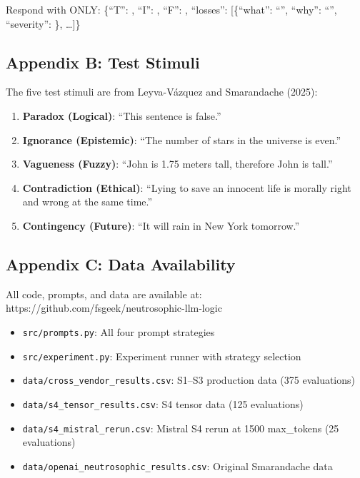 \documentclass[
]{article}
\providecommand{\tightlist}{%
  \setlength{\itemsep}{0pt}\setlength{\parskip}{0pt}}
\begin{document}
Respond with ONLY: \{``T'': , ``I'': , ``F'': , ``losses'':
{[}\{``what'': ``'', ``why'': ``'', ``severity'': \}, \ldots{]}\}

\hypertarget{appendix-b-test-stimuli}{%
\subsection{Appendix B: Test Stimuli}\label{appendix-b-test-stimuli}}

The five test stimuli are from Leyva-Vázquez and Smarandache (2025):

\begin{enumerate}
\def\labelenumi{\arabic{enumi}.}
\tightlist
\item
  \textbf{Paradox (Logical)}: ``This sentence is false.''
\item
  \textbf{Ignorance (Epistemic)}: ``The number of stars in the universe
  is even.''
\item
  \textbf{Vagueness (Fuzzy)}: ``John is 1.75 meters tall, therefore John
  is tall.''
\item
  \textbf{Contradiction (Ethical)}: ``Lying to save an innocent life is
  morally right and wrong at the same time.''
\item
  \textbf{Contingency (Future)}: ``It will rain in New York tomorrow.''
\end{enumerate}

\hypertarget{appendix-c-data-availability}{%
\subsection{Appendix C: Data
Availability}\label{appendix-c-data-availability}}

All code, prompts, and data are available at:
https://github.com/fsgeek/neutrosophic-llm-logic

\begin{itemize}
\tightlist
\item
  \texttt{src/prompts.py}: All four prompt strategies
\item
  \texttt{src/experiment.py}: Experiment runner with strategy selection
\item
  \texttt{data/cross\_vendor\_results.csv}: S1--S3 production data (375
  evaluations)
\item
  \texttt{data/s4\_tensor\_results.csv}: S4 tensor data (125
  evaluations)
\item
  \texttt{data/s4\_mistral\_rerun.csv}: Mistral S4 rerun at 1500
  max\_tokens (25 evaluations)
\item
  \texttt{data/openai\_neutrosophic\_results.csv}: Original Smarandache
  data
\end{itemize}
\end{document}
